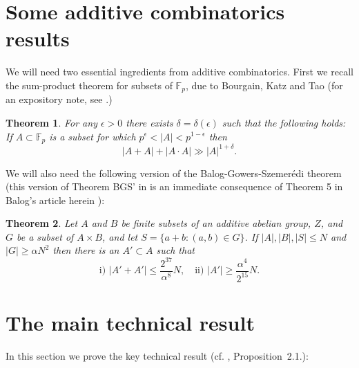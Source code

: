 \documentclass[11pt]{amsart}
\newtheorem{thm}{Theorem}[section]
\newcommand{\fp}{\mathbb{F}_p}
\newcommand{\gplus}{{\stackrel{G}{+}  }}
\begin{document}
\section{Some additive combinatorics results}
\label{sec:addit-comb-backgr}


We will need two essential ingredients from additive combinatorics.
First we recall the sum-product theorem for
subsets of $\fp$, due to Bourgain, Katz and Tao \cite{bokata04} 
(for an expository note, see \cite{gre05-sum-product}.)
\begin{thm}
\label{t:sum-product} For any $\epsilon>0$ there exists
$\delta=\delta(\epsilon)$ such that the following holds: If $A
\subset \fp$ is a subset for which $p^\epsilon < |A| <
p^{1-\epsilon}$ then
$$
|A + A|+|A \cdot A| \gg |A|^{1+\delta} .
$$
\end{thm}


We will also need the following version of the Balog-Gowers-Szemer\'edi
theorem (this version of Theorem BGS' in   \cite{boch06} is an
immediate consequence of Theorem 5 in Balog's article herein
\cite{bal07}):


\begin{thm}\label{t:bgs}
Let $A$ and $B$ be finite subsets of an additive abelian group, $Z$,
and $G$ be a subset of $A\times B$, and let $S=\{a+b: (a,b)\in G\}$. If
$|A|, |B|, |S| \leq N$ and $|G|\geq \alpha N^2$ then there is an
$A'\subset A$ such that
\begin{equation}
\text{i) } |A'+A'|\leq \frac{2^{37}}{\alpha^8}N,\quad \text{ii) }
|A'|\geq \frac{\alpha^4}{2^{15}}N.
\end{equation}
\end{thm}








\section{The main technical result}
\label{sec:proof-of-prop-2.1}

In this section we prove the key technical result (cf.
\cite{boch06}, Proposition~2.1.):
\end{document}
